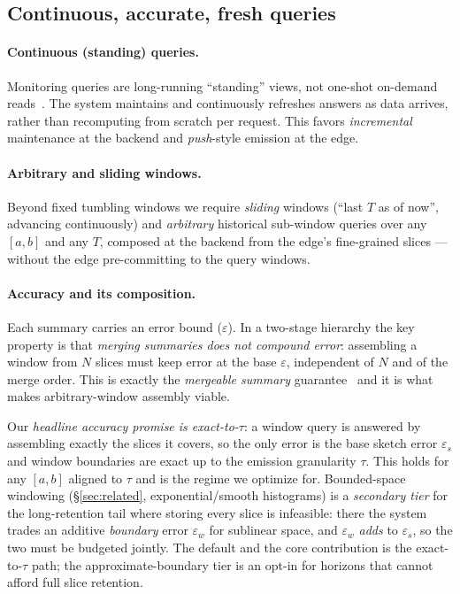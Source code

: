 \subsection{Continuous, accurate, fresh queries}

\paragraph{Continuous (standing) queries.}
Monitoring queries are long-running ``standing'' views, not one-shot
on-demand reads~\cite{babcock2002models}. The system maintains and
continuously refreshes answers as data arrives, rather than recomputing
from scratch per request. This favors \emph{incremental} maintenance at
the backend and \emph{push}-style emission at the edge.

\paragraph{Arbitrary and sliding windows.}
Beyond fixed tumbling windows we require \emph{sliding} windows (``last
$T$ as of now'', advancing continuously) and \emph{arbitrary} historical
sub-window queries over any $[a,b]$ and any $T$, composed at the backend
from the edge's fine-grained slices --- without the edge pre-committing to
the query windows.

\paragraph{Accuracy and its composition.}
Each summary carries an error bound ($\varepsilon$). In a two-stage
hierarchy the key property is that \emph{merging summaries does not
compound error}: assembling a window from $N$ slices must keep error at
the base $\varepsilon$, independent of $N$ and of the merge order. This is
exactly the \emph{mergeable summary} guarantee~\cite{agarwal2013mergeable}
and it is what makes arbitrary-window assembly viable.

Our \emph{headline accuracy promise is exact-to-$\tau$}: a window query is
answered by assembling exactly the slices it covers, so the only error is
the base sketch error $\varepsilon_s$ and window boundaries are exact up to
the emission granularity $\tau$. This holds for any $[a,b]$ aligned to
$\tau$ and is the regime we optimize for. Bounded-space windowing
(\S\ref{sec:related}, exponential/smooth histograms) is a \emph{secondary
tier} for the long-retention tail where storing every slice is infeasible:
there the system trades an additive \emph{boundary} error
$\varepsilon_w$ for sublinear space, and $\varepsilon_w$ \emph{adds} to
$\varepsilon_s$, so the two must be budgeted jointly. The default and the
core contribution is the exact-to-$\tau$ path; the approximate-boundary
tier is an opt-in for horizons that cannot afford full slice retention.

